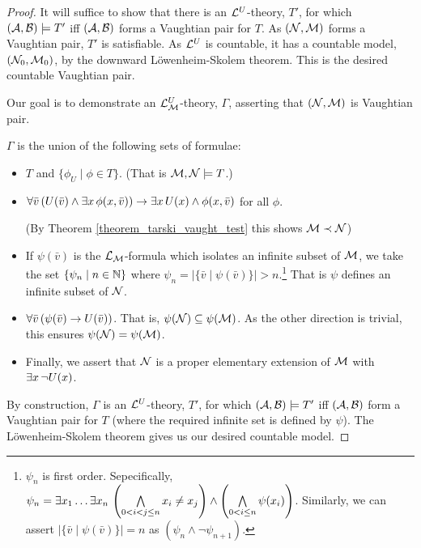 \begin{proof}
It will suffice to show that there is an \(\mathcal{L}^U\)-theory, \(T'\), for which \((\mathcal{A}, \mathcal{B}) \models T'\) iff \((\mathcal{A}, \mathcal{B})\) forms a Vaughtian pair for \(T\). 
As \((\mathcal{N}, \mathcal{M})\) forms a Vaughtian pair, \(T'\) is satisfiable.
As \(\mathcal{L}^U\) is countable, it has a countable model, \((\mathcal{N}_0, \mathcal{M}_0)\), by the downward L\"owenheim-Skolem theorem.
This is the desired countable Vaughtian pair. 

Our goal is to demonstrate an \(\mathcal{L}_{\mathcal{M}}^U\)-theory, \(\Gamma\), asserting that \((\mathcal{N}, \mathcal{M})\) is Vaughtian pair.

\(\Gamma\) is the union of the following sets of formulae:
\begin{itemize}
\item \(T\) and \(\{\phi_U \mid \phi \in T\}\). (That is \(\mathcal{M}, \mathcal{N} \models T\).)
\item \(\forall \bar{v} \, (U(\bar{v}) \land \exists x \, \phi(x, \bar{v})) \to \exists x \, U(x) \land \phi(x, \bar{v})\) for all \(\phi\). 

(By Theorem \ref{theorem_tarski_vaught_test} this shows \(\mathcal{M} \prec \mathcal{N}\)) 

\item If \(\psi(\bar{v})\) is the \(\mathcal{L}_{\mathcal{M}}\)-formula which isolates an infinite subset of \(\mathcal{M}\), we take the set \(\{\psi_n \mid n \in \mathbb{N}\}\) where \(\psi_n = |\{\bar{v} \mid \psi(\bar{v})\}| > n\).\footnote{\(\psi_n\) is first order. Sepecifically, \(\psi_n = \exists x_1 \ldots \exists x_n \, \left(\bigwedge\limits_{0 <i < j \leq n} x_i \neq x_j\right) \land \left(\bigwedge\limits_{0 < i \leq n} \psi(x_i)\right)\). Similarly, we can assert \(|\{\bar{v} \mid \psi(\bar{v})\}| = n\) as \((\psi_n \land \neg \psi_{n+1})\).}
That is \(\psi\) defines an infinite subset of \(\mathcal{N}\).

\item \(\forall \bar{v} \, (\psi(\bar{v}) \to U(\bar{v}))\). That is, \(\psi(\mathcal{N}) \subseteq \psi(\mathcal{M})\). As the other direction is trivial, this ensures \(\psi(\mathcal{N}) = \psi(\mathcal{M})\). 
\item Finally, we assert that \(\mathcal{N}\) is a proper elementary extension of \(\mathcal{M}\) with \(\exists x \, \neg U(x)\). 
\end{itemize}

By construction, \(\Gamma\) is an \(\mathcal{L}^U\)-theory, \(T'\), for which \((\mathcal{A}, \mathcal{B}) \models T'\) iff \((\mathcal{A}, \mathcal{B})\) form a Vaughtian pair for \(T\) (where the required infinite set is defined by \(\psi\)). 
The L\"owenheim-Skolem theorem gives us our desired countable model. 
\end{proof}

